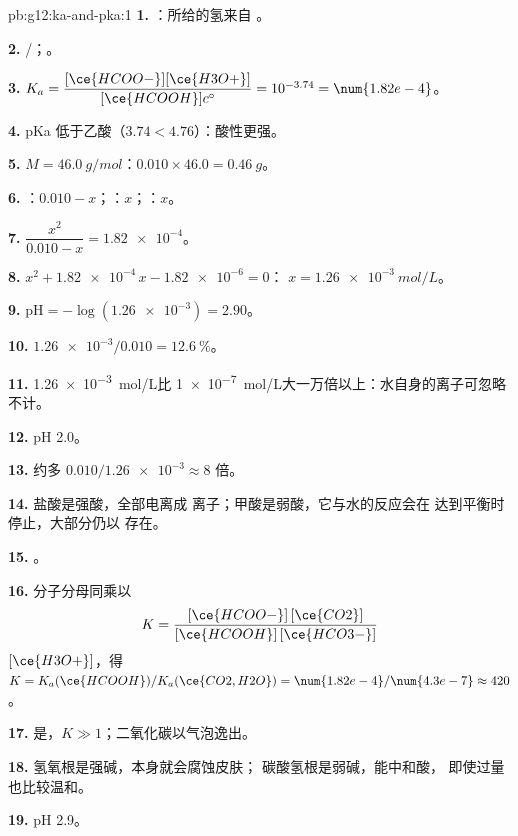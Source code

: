 \begin{solution}{pb:g12:ka-and-pka:1}
\textbf{1.} ：所给的氢来自 。

\textbf{2.} /；。

\textbf{3.} $K_a = \dfrac{[\ce{HCOO-}][\ce{H3O+}]}{[\ce{HCOOH}]c^\circ} =
10^{-3.74} = \num{1.82e-4}$。

\textbf{4.} pKa 低于乙酸（$3.74 < 4.76$）：酸性更强。

\textbf{5.} $M = \qty{46.0}{g/mol}$：$0.010 \times 46.0 = \qty{0.46}{g}$。

\textbf{6.} ：$0.010 - x$；：$x$；：$x$。

\textbf{7.} $\dfrac{x^2}{0.010 - x} = \num{1.82e-4}$。

\textbf{8.} $x^2 + \num{1.82e-4}\,x - \num{1.82e-6} = 0$：
$x = \qty{1.26e-3}{mol/L}$。

\textbf{9.} $\mathrm{pH} = -\log(\num{1.26e-3}) = 2.90$。

\textbf{10.} $\num{1.26e-3}/0.010 = \qty{12.6}{\percent}$。

\textbf{11.} \qty{1.26e-3}{mol/L}比
\qty{1e-7}{mol/L}大一万倍以上：水自身的离子可忽略不计。

\textbf{12.} pH 2.0。

\textbf{13.} 约多 $0.010 / \num{1.26e-3} \approx 8$ 倍。

\textbf{14.} 盐酸是强酸，全部电离成
离子；甲酸是弱酸，它与水的反应会在
达到平衡时停止，大部分仍以  存在。

\textbf{15.} 。

\textbf{16.} 分子分母同乘以
\[
  K = \frac{[\ce{HCOO-}]\,[\ce{CO2}]}{[\ce{HCOOH}]\,[\ce{HCO3-}]}
\]
$[\ce{H3O+}]$，得 $K = K_a(\ce{HCOOH}) / K_a(\ce{CO2,H2O}) =
\num{1.82e-4}/\num{4.3e-7} \approx 420$。

\textbf{17.} 是，$K \gg 1$；二氧化碳以气泡逸出。

\textbf{18.} 氢氧根是强碱，本身就会腐蚀皮肤；
碳酸氢根是弱碱，能中和酸，
即使过量也比较温和。

\textbf{19.} pH 2.9。
\end{solution}
